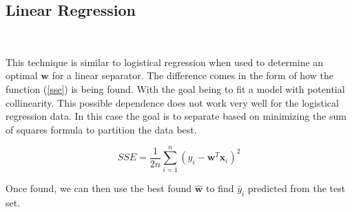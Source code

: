\documentclass{article}
\begin{document}
		\subsection{Linear Regression}~
		
		This technique is similar to logistical regression when used to determine an optimal $ \mathbf{w} $ for a linear separator. The difference comes in the form of how the function (\ref{sse}) is being found. With the goal being to fit a model with potential collinearity. This possible dependence does not work very well for the logistical regression data. In this case the goal is to separate based on minimizing the sum of squares formula to partition the data best.
				
		\begin{equation}\label{sse}
			SSE = \dfrac{1}{2n}\sum\limits_{i=1}^n(y_i - \mathbf{w}^T\mathbf{x}_i)^2
		\end{equation}
		
		Once found, we can then use the best found $ \mathbf{\hat w} $ to find $ \hat y_i $ predicted from the test set.
				
\end{document}
